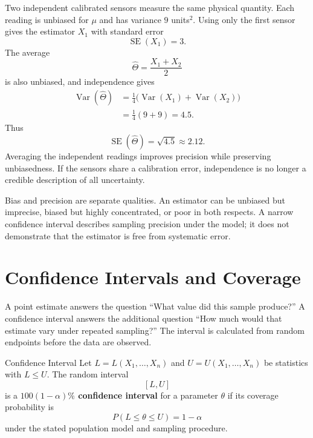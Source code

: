 \begin{example}\par
Two independent calibrated sensors measure the same physical quantity. Each reading is unbiased for $\mu$ and has variance $9$ units$^2$. Using only the first sensor gives the estimator $X_1$ with standard error
\[
    \operatorname{SE}(X_1)=3.
\]
The average
\[
    \widehat\Theta=\frac{X_1+X_2}{2}
\]
is also unbiased, and independence gives
\[
\begin{aligned}
    \operatorname{Var}(\widehat\Theta)
      &=\frac{1}{4}\bigl(\operatorname{Var}(X_1)
        +\operatorname{Var}(X_2)\bigr)\\
      &=\frac{1}{4}(9+9)=4.5.
\end{aligned}
\]
Thus
\[
    \operatorname{SE}(\widehat\Theta)=\sqrt{4.5}\approx2.12.
\]
Averaging the independent readings improves precision while preserving unbiasedness. If the sensors share a calibration error, independence is no longer a credible description of all uncertainty.
\end{example}

Bias and precision are separate qualities. An estimator can be unbiased but imprecise, biased but highly concentrated, or poor in both respects. A narrow confidence interval describes sampling precision under the model; it does not demonstrate that the estimator is free from systematic error.

\section{Confidence Intervals and Coverage}
\label{sec:confidence-interval-coverage}

A point estimate answers the question ``What value did this sample produce?'' A confidence interval answers the additional question ``How much would that estimate vary under repeated sampling?'' The interval is calculated from random endpoints before the data are observed.

\begin{definition}{Confidence Interval}
Let $L=L(X_1,\ldots,X_n)$ and $U=U(X_1,\ldots,X_n)$ be statistics with $L\leq U$. The random interval
\[
    [L,U]
\]
is a \textbf{$100(1-\alpha)\%$ confidence interval} for a parameter $\theta$ if its coverage probability is
\[
    P(L\leq\theta\leq U)=1-\alpha
\]
under the stated population model and sampling procedure.
\end{definition}

